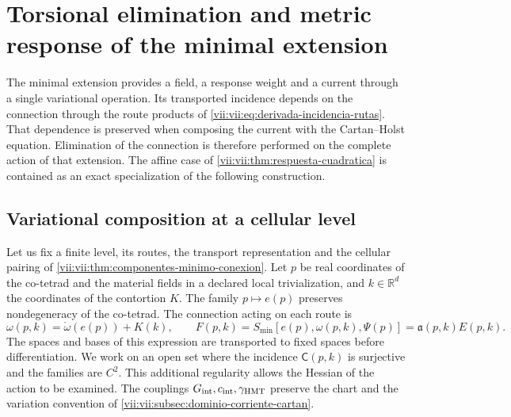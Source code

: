 
\section{Torsional elimination and metric response of the minimal extension}
\label{vii:vii:sec:eliminacion-torsional-no-lineal}

The minimal extension provides a field, a response weight and a
current through a single variational operation. Its transported
incidence depends on the connection through the route products of
\eqref{vii:vii:eq:derivada-incidencia-rutas}. That dependence is preserved when
composing the current with the Cartan--Holst equation. Elimination
of the connection is therefore performed on the complete action of that
extension. The affine case of
\ref{vii:vii:thm:respuesta-cuadratica} is contained as an
exact specialization of the following construction.

\subsection{Variational composition at a cellular level}
\label{vii:vii:subsec:composicion-torsional-celular}

Let us fix a finite level, its routes, the transport representation and
the cellular pairing of
\ref{vii:vii:thm:componentes-minimo-conexion}. Let \(p\) be real coordinates
of the co-tetrad and the material fields in a declared local
trivialization, and \(k\in\mathbb R^d\) the coordinates of the
contortion \(K\). The family \(p\mapsto e(p)\) preserves
nondegeneracy of the co-tetrad. The connection acting on each route is
\begin{equation}
 \omega(p,k)=\mathring\omega(e(p))+K(k),\qquad
 F(p,k)=S_{\min}[e(p),\omega(p,k),\Psi(p)]
       =\mathfrak a(p,k)E(p,k).
 \label{vii:vii:eq:accion-minima-en-contorsion}
\end{equation}
The spaces and bases of this expression are transported to fixed
spaces before differentiation. We work on an open set where the incidence
\(\mathsf C(p,k)\) is surjective and the families are \(C^2\).
This additional regularity allows the Hessian of the action to be examined.
The couplings \(G_{\rm int},c_{\rm int},\gamma_{\rm HMT}\)
preserve the chart and the variation convention of
\ref{vii:vii:subsec:dominio-corriente-cartan}.

